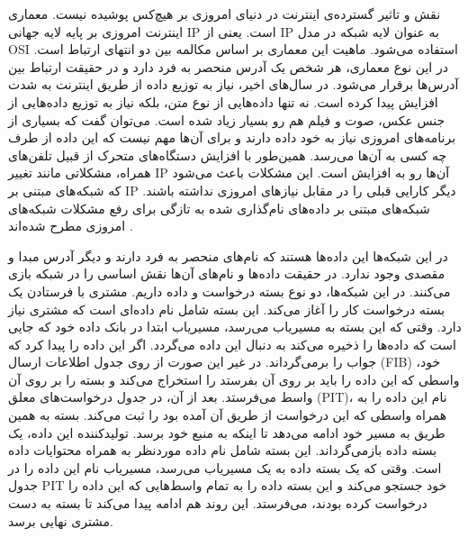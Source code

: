 

نقش و تاثیر گسترده‌ی اینترنت در دنیای امروزی بر هیچ‌کس پوشیده نیست. معماری اینترنت امروزی بر پایه لایه جهانی IP است. یعنی از IP به عنوان لایه شبکه در مدل OSI  استفاده می‌شود. ماهیت این معماری بر اساس مکالمه بین دو انتهای ارتباط است. در این نوع معماری، هر شخص یک آدرس منحصر به فرد دارد و در حقیقت ارتباط بین آدرس‌ها برقرار می‌شود. 
در سال‌های اخیر، نیاز به توزیع داده‌ از طریق اینترنت به شدت افزایش پیدا کرده است. نه تنها داده‌هایی از نوع متن، بلکه نیاز به توزیع داده‌هایی از جنس عکس، صوت و فیلم هم رو بسیار زیاد شده است. می‌توان گفت که بسیاری از برنامه‌های امروزی نیاز به خود داده دارند و برای آن‌ها مهم نیست که این داده از طرف چه کسی به آن‌ها می‌رسد. همین‌طور با افزایش دستگاه‌های متحرک از قبیل تلفن‌های همراه، مشکلاتی مانند تغییر IP آن‌ها رو به افزایش است. این مشکلات باعث می‌شود که شبکه‌‌های مبتنی بر IP دیگر کارایی قبلی را در مقابل نیازهای امروزی نداشته باشند. شبکه‌های مبتنی بر داده‌‌های نام‌گذاری شده به تازگی برای رفع مشکلات شبکه‌های امروزی مطرح شده‌اند
\cite{ndn}.

در این شبکه‌ها این داده‌ها هستند که نام‌های منحصر به فرد دارند و دیگر آدرس مبدا و مقصدی وجود ندارد. در حقیقت داده‌ها و نام‌‌های آن‌ها نقش اساسی را در شبکه بازی می‌کنند. در این شبکه‌ها، دو نوع بسته درخواست و داده داریم. مشتری با فرستادن یک بسته درخواست کار را آغاز می‌کند. این بسته شامل نام داده‌ای است که مشتری نیاز دارد. وقتی که این بسته به مسیریاب می‌رسد، مسیریاب ابتدا در بانک داده خود که جایی است که داده‌ها را ذخیره می‌کند به دنبال این داده می‌گردد. اگر این داده را پیدا کرد که جواب را برمی‌گرداند. در غیر این صورت از روی جدول اطلاعات ارسال (FIB) خود، واسطی که این داده را باید بر روی آن بفرستد را استخراج می‌کند و بسته را بر روی آن واسط می‌فرستد. بعد از آن، در جدول درخواست‌های معلق (PIT)، نام این داده را به همراه واسطی که این درخواست از طریق آن آمده بود را ثبت می‌کند. بسته به همین‌ طریق به مسیر خود ادامه می‌دهد تا اینکه به منبع خود برسد. تولیدکننده این داده، یک بسته داده بازمی‌گرداند. این بسته شامل نام داده موردنظر به همراه محتوایات داده است. وقتی که یک بسته داده به یک مسیریاب می‌رسد، مسیریاب نام این داده را در جدول PIT خود جستجو می‌کند و این بسته داده را به تمام واسط‌هایی که این داده را درخواست کرده بودند، می‌فرستد. این روند هم ادامه پیدا می‌کند تا بسته به دست مشتری نهایی برسد. 
 
